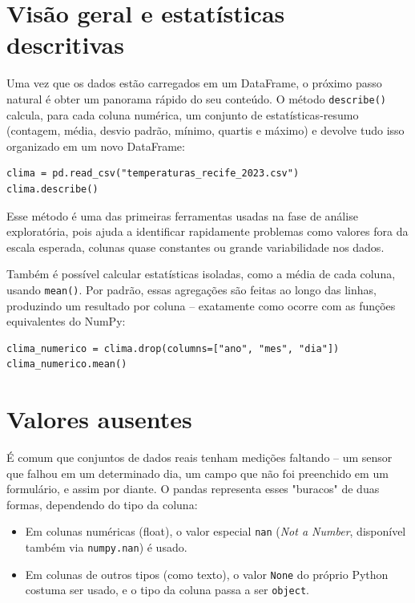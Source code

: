 \documentclass[11pt,a4paper]{article}
\begin{document}
\section{Visão geral e estatísticas descritivas}

Uma vez que os dados estão carregados em um DataFrame, o próximo passo natural é obter um panorama rápido do seu conteúdo. O método \texttt{describe()} calcula, para cada coluna numérica, um conjunto de estatísticas-resumo (contagem, média, desvio padrão, mínimo, quartis e máximo) e devolve tudo isso organizado em um novo DataFrame:
\begin{lstlisting}
clima = pd.read_csv("temperaturas_recife_2023.csv")
clima.describe()
\end{lstlisting}

Esse método é uma das primeiras ferramentas usadas na fase de análise exploratória, pois ajuda a identificar rapidamente problemas como valores fora da escala esperada, colunas quase constantes ou grande variabilidade nos dados.

Também é possível calcular estatísticas isoladas, como a média de cada coluna, usando \texttt{mean()}. Por padrão, essas agregações são feitas ao longo das linhas, produzindo um resultado por coluna -- exatamente como ocorre com as funções equivalentes do NumPy:
\begin{lstlisting}
clima_numerico = clima.drop(columns=["ano", "mes", "dia"])
clima_numerico.mean()
\end{lstlisting}

\section{Valores ausentes}

É comum que conjuntos de dados reais tenham medições faltando -- um sensor que falhou em um determinado dia, um campo que não foi preenchido em um formulário, e assim por diante. O pandas representa esses "buracos" de duas formas, dependendo do tipo da coluna:
\begin{itemize}
    \item Em colunas numéricas (float), o valor especial \texttt{nan} (\textit{Not a Number}, disponível também via \texttt{numpy.nan}) é usado.
    \item Em colunas de outros tipos (como texto), o valor \texttt{None} do próprio Python costuma ser usado, e o tipo da coluna passa a ser \texttt{object}.
\end{itemize}
\end{document}
